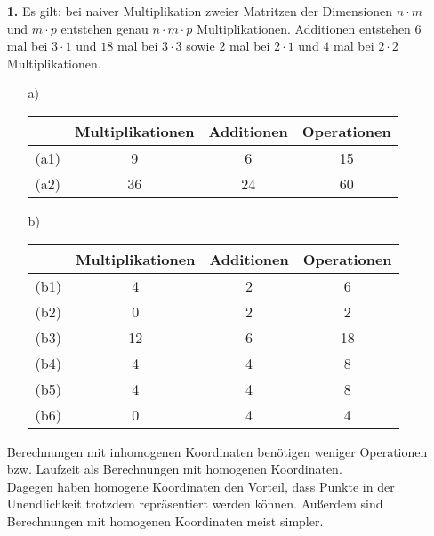 \documentclass [a4paper,11pt]{article}
\author{\authorinfotitle}
\title{\titleinfo}
\date{\today}
\begin{document}
\maketitle
    \begin{enumerate}
        \item[\textbf{1.}]
            Es gilt: bei naiver Multiplikation zweier Matritzen der Dimensionen $n \cdot m$ und $m \cdot p$ entstehen genau
            $n \cdot m \cdot p$ Multiplikationen. Additionen entstehen $6$ mal bei $3 \cdot 1$ und $18$ mal bei $3 \cdot 3$ sowie
            $2$ mal bei $2 \cdot 1$ und $4$ mal bei $2 \cdot 2$ Multiplikationen.
        \begin{enumerate}
        \item[a)]
            \begin{enumerate}
                \begin{tabular}{l | c | c || c}
                    & Multiplikationen & Additionen & Operationen\\
                    \hline
                    (a1) & 9 & 6 & 15\\
                    (a2) & 36 & 24 & 60\\
                \end{tabular}
            \end{enumerate}
        \vspace{10pt}
        \item[b)]
                \begin{tabular}{l | c | c || c}
                    & Multiplikationen & Additionen & Operationen\\
                    \hline
                    (b1) & 4 & 2 & 6\\
                    (b2) & 0 & 2 & 2\\
                    (b3) & 12 & 6 & 18\\
                    (b4) & 4 & 4 & 8\\
                    (b5) & 4 & 4 & 8\\
                    (b6) & 0 & 4 & 4\\
                \end{tabular}
        \end{enumerate}

        Berechnungen mit inhomogenen Koordinaten benötigen weniger Operationen bzw. Laufzeit als Berechnungen
        mit homogenen Koordinaten.\\
        Dagegen haben homogene Koordinaten den Vorteil, dass Punkte in der Unendlichkeit trotzdem repräsentiert werden können.
        Außerdem sind Berechnungen mit homogenen Koordinaten meist simpler.


    \end{enumerate}
\end{document}
